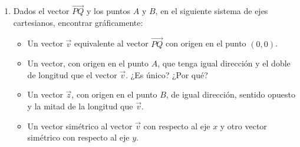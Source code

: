 \begin{enumerate}[\hspace{-3mm}$1)$]

\item Dados el vector $\overrightarrow{PQ}$ y los puntos $A$ y $B$, en el siguiente sistema de ejes cartesianos, encontrar gráficamente:

\begin{center}
\end{center}

\begin{itemize}
    \item[a)] Un vector $\vec v$ equivalente al vector $\overrightarrow{PQ}$ con origen en el punto $(0,0)$.
    \item[b)] Un vector, con origen en el punto $A$, que tenga igual dirección y el doble de longitud que el vector $\vec v$. ¿Es único? ¿Por qué?
    \item[c)] Un vector $\vec z$, con origen en el punto $B$, de igual dirección, sentido opuesto y la mitad de la longitud que $\vec v$.
    \item[d)] Un vector simétrico al vector $\vec v$ con respecto al eje $x$ y otro vector simétrico con respecto al eje $y$.
\end{itemize}


\end{enumerate}
